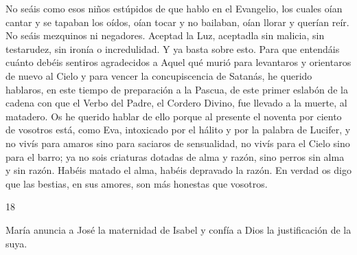 \documentclass[12pt]{book} %
\begin{document}
No seáis como esos niños estúpidos de que hablo en el Evangelio, los cuales oían cantar y se tapaban los oídos, oían tocar y no bailaban, oían llorar y querían reír. No seáis mezquinos ni negadores. Aceptad la Luz, aceptadla sin malicia, sin testarudez, sin ironía o incredulidad. Y ya basta sobre esto. 
Para que entendáis cuánto debéis sentiros agradecidos a Aquel qué murió para levantaros y orientaros de nuevo al Cielo y para vencer la concupiscencia de Satanás, he querido hablaros, en este tiempo de preparación a la Pascua, de este primer eslabón de la cadena con que el Verbo del Padre, el Cordero Divino, fue llevado a la muerte, al matadero. Os he querido hablar de ello porque al presente el noventa por ciento de vosotros está, como Eva, intoxicado por el hálito y por la palabra de Lucifer, y no vivís para amaros sino para saciaros de sensualidad, no vivís para el Cielo sino para el barro; ya no sois criaturas dotadas de alma y razón, sino perros sin alma y sin razón. Habéis matado el alma, habéis depravado la razón. En verdad os digo que las bestias, en sus amores, son más honestas que vosotros. 
 
18 
 
María anuncia a José la maternidad de Isabel  y confía a Dios la justificación de la suya. 
 
\end{document}
